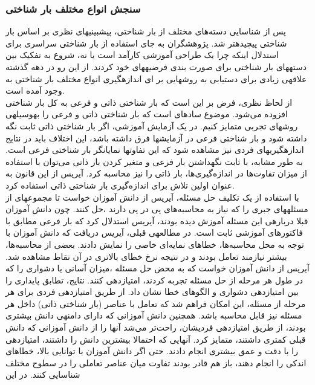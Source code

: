 \subsubsection{سنجش انواع مختلف بار شناختی}
پس  از  شناسایی دسته‌های  مختلف  از  بار  شناختی، پيشبينیهای نظری بر  اساس  بار  شناختی
پيچيدهتر شد. پژوهشگران به جای استفاده از بار شناختی سراسری برای استدلال اینکه چرا یک طراحی
آموزشی كارآمد است یا نه، شروع به تفکيک بين دستههای بار شناختی برای صورت بندی فرضيههای خود 
كردند. از این رو در دهه گذشته علاقهی زیادی برای دستيابی به روشهایی بر ای اندازهگيری انواع مختلف 
بار شناختی به وجود آمده است.
\cite{antonenko2010using}
\\
از لحاظ نظری، فرض بر این است كه بار شناختی ذاتی و فرعی به كل بار شناختی افزوده می‌شود.
موضوع سادهای است كه بار شناختی ذاتی و فرعی را بهوسيلهی روشهای تجربی متمایز كنيم. در یک
آزمایش آموزشی، اگر بار شناختی ذاتی ثابت نگه داشته شود و بار شناختی فرعی در آزمایشها فرق داشته 
باشد،  این اختلاف  باید در  نتایج اندازهگيریهای فردی نيز مشاهده  شود  كه  این تفاوتها نمایانگر بار 
شناختی فرعی است. به طور مشابه، با ثابت نگهداشتن بار فرعی و متغير كردن بار ذاتی می‌توان با استفاده 
از ميزان تفاوت‌ها در اندازه‌گيری‌ها، بار ذاتی را نيز محاسبه كرد. آیریس از این قانون به عنوان اولين تلاش 
برای اندازه‌گيری بار شناختی ذاتی استفاده كرد.
\cite{antonenko2010using}
\\
با استفاده از یک تکليف حل مسئله، آیریس از دانش آموزان خواست تا مجموعهای از مسئلههای جبری
را كه نياز به محاسبه‌های پی در پی دارند ،حل كنند. چون دانش آموزان قبلا دربارهی این مسئله آموزش دیده
بودند، آیریس استدلال كرد كه بار فرعی مطابق با فاكتورهای آموزشی ثابت است.
\cite{ayres2006using}
در مطالعهی قبلی، آیریس دریافت كه دانش آموزان با توجه به محل محاسبه‌ها، خطاهای نمایه‌ای 
خاصی را نمایش دادند. 
بعضی از  محاسبه‌ها،  بيشتر نيازمند تعامل بودند  و  در نتيجه نرخ  خطای بالاتری در  آن  نقاط  مشاهده 
شد.
\cite{ayres2001systematic}
آیریس از دانش آموزان خواست كه به محض حل مسئله ،ميزان آسانی یا دشواری را كه در طول 
هر مرحله از حل مسئله تجربه كردند، امتيازدهی كنند. نتایج، تطابق پایداری را بين امتيازدهی دشواری و 
الگوهای خطا نشان داد. از طریق امتيازدهی فردی برای هر مرحله از مسئله، این امکان فراهم شد كه 
تعامل با عناصر (بار شناختی ذاتی) داخل هر مسئله نيز قابل محاسبه باشد. همچنين دانش آموزانی كه
دارای دامنهی دانش بيشتری بودند، از طریق امتيازدهی فردیشان، راحت‌تر می‌شد آنها  را  از دانش
آموزانی كه دانش قبلی كمتری داشتند،  متمایز كرد.  آنهایی كه احتمالا بيشترین دانش  را  داشتند، 
امتيازدهی را با دقت و عمق بيشتری انجام دادند. حتی اگر دانش آموزان با توانایی بالا، خطاهای اندكی را 
انجام دهند، باز هم قادر بودند تفاوت ميان عناصر تعاملی را در سطوح مختلف شناسایی كنند. در این
